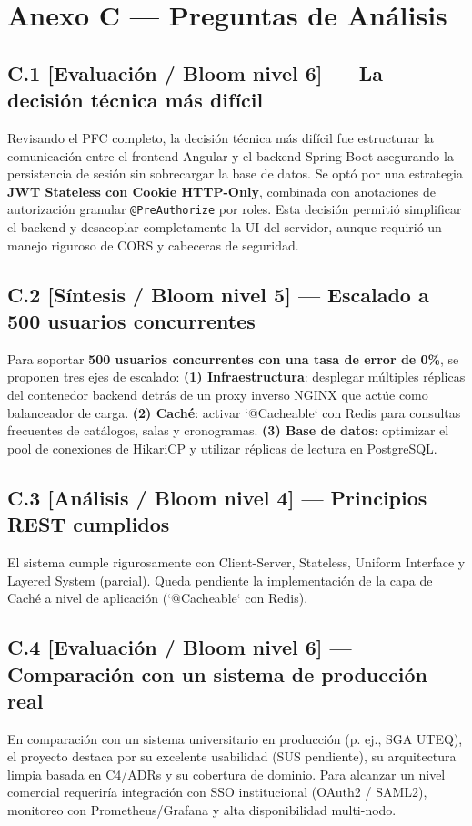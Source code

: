 \section*{Anexo C --- Preguntas de Análisis}
\subsection*{C.1 [Evaluación / Bloom nivel 6] --- La decisión técnica más difícil}

Revisando el PFC completo, la decisión técnica más difícil fue estructurar la comunicación entre el frontend Angular
y el backend Spring Boot asegurando la persistencia de sesión sin sobrecargar la base de datos. Se optó por una
estrategia \textbf{JWT Stateless con Cookie HTTP-Only}, combinada con anotaciones de autorización granular
\texttt{@PreAuthorize} por roles. Esta decisión permitió simplificar el backend y desacoplar completamente la UI
del servidor, aunque requirió un manejo riguroso de CORS y cabeceras de seguridad.

\subsection*{C.2 [Síntesis / Bloom nivel 5] --- Escalado a 500 usuarios concurrentes}

Para soportar \textbf{500 usuarios concurrentes con una tasa de error de 0\%}, se proponen tres ejes de escalado:
\textbf{(1) Infraestructura}: desplegar múltiples réplicas del contenedor backend detrás de un proxy inverso NGINX
que actúe como balanceador de carga. \textbf{(2) Caché}: activar `@Cacheable` con Redis para consultas frecuentes de
catálogos, salas y cronogramas. \textbf{(3) Base de datos}: optimizar el pool de conexiones de HikariCP y utilizar
réplicas de lectura en PostgreSQL.

\subsection*{C.3 [Análisis / Bloom nivel 4] --- Principios REST cumplidos}

El sistema cumple rigurosamente con Client-Server, Stateless, Uniform Interface y Layered System (parcial). Queda
pendiente la implementación de la capa de Caché a nivel de aplicación (`@Cacheable` con Redis).

\subsection*{C.4 [Evaluación / Bloom nivel 6] --- Comparación con un sistema de producción real}

En comparación con un sistema universitario en producción (p. ej., SGA UTEQ), el proyecto destaca por su excelente
usabilidad (SUS pendiente), su arquitectura limpia basada en C4/ADRs y su cobertura de dominio. Para alcanzar un nivel
comercial requeriría integración con SSO institucional (OAuth2 / SAML2), monitoreo con Prometheus/Grafana y alta
disponibilidad multi-nodo.

